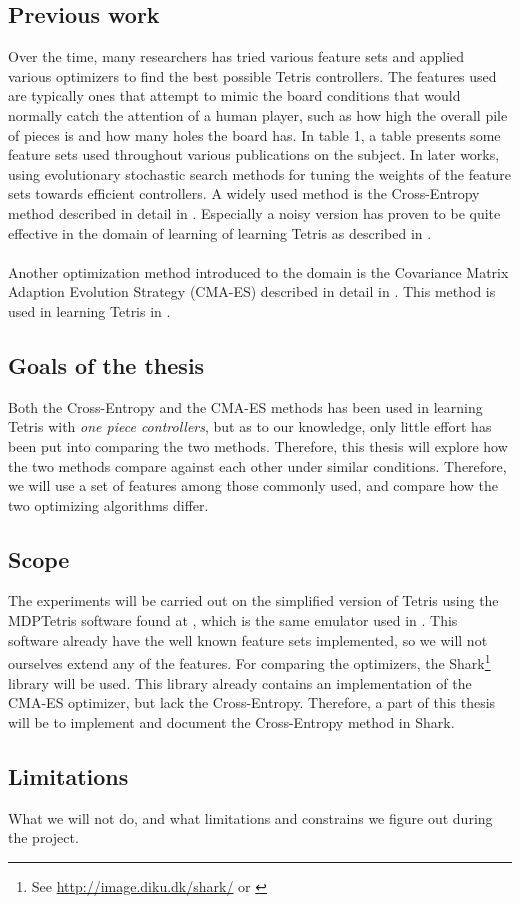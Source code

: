 \subsection{Previous work}

Over the time, many researchers has tried various feature 
sets and applied various optimizers to find the best 
possible Tetris controllers. The features used are typically
ones that attempt to mimic the board conditions that would
normally catch the attention of a human player, such as
how high the overall pile of pieces is and how many holes 
the board has. In \cite{scherrer2009:b} table 1, a table 
presents some feature sets used throughout various publications
on the subject. In later works, using evolutionary stochastic 
search methods for tuning the weights of the feature sets towards
efficient controllers. A widely used method is the 
Cross-Entropy method described in detail in \citep{cetut2014}. 
Especially a noisy version has proven to be quite effective in the
domain of learning of learning Tetris as 
described in \cite{szita:06}.\\
\\
Another optimization
method introduced to the domain  is the Covariance Matrix
Adaption Evolution Strategy (CMA-ES) described in detail in 
\cite{hansen2011}. This method is used in learning Tetris in 
\cite{boumaza2011:a}.

\subsection{Goals of the thesis}


Both the Cross-Entropy and the CMA-ES methods has been used 
in learning Tetris with \textit{one piece controllers}, but as 
to our knowledge, only little effort has been put into 
comparing the two methods. Therefore, this thesis will explore
how the two methods compare against each other under similar
conditions. Therefore, we will use a set of features among those
commonly used, and compare how the two optimizing algorithms 
differ.


\subsection{Scope\label{section:scope}}

The experiments will be carried out on the simplified version of
Tetris using the MDPTetris software found at \cite{mdptetris},
which is the same emulator used in \cite{scherrer2009:b}.
This software already have the well known feature sets
implemented, so we will not ourselves extend any of the features.
For comparing the optimizers, the Shark\footnote{See \url{http://image.diku.dk/shark/} or  \cite{shark08}
} library will be used. This library already contains an
implementation of the CMA-ES optimizer, but lack the 
Cross-Entropy. Therefore, a part of this thesis will
be to implement and document the Cross-Entropy method in Shark.


\subsection{Limitations}

What we will not do, and what limitations and constrains
we figure out during the project.

